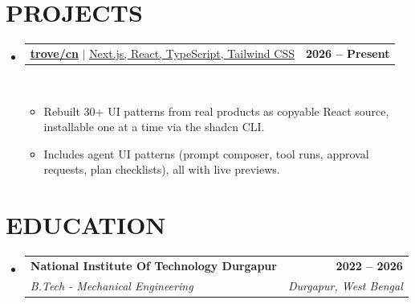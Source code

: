 \documentclass[letterpaper, 10pt]{article}
\makeatletter
\newcommand{\resumeItem}[1]{ \item\small{ {#1 \vspace{-3pt}} } }
\newcommand{\resumeSubheading}[4]{
\vspace{2pt}
\item
\begin{tabular*}{1.0\textwidth}[t]{l@{\extracolsep{\fill}}r}
  \textbf{#1} & \textbf{\small #2} \\
  \textit{\small#3} & \textit{\small #4} \\
\end{tabular*}
\vspace{-5pt}
}
\newcommand{\resumeProjectHeading}[2]{ \item
\begin{tabular*}{1.001\textwidth}{l@{\extracolsep{\fill}}r}
  \small#1 & \textbf{\small #2} \\
\end{tabular*}
\vspace{-7pt}
}
\newcommand{\resumeSubHeadingListStart}{\begin{itemize}[leftmargin=0.0in, label={}]}
\newcommand{\resumeSubHeadingListEnd}{\end{itemize}}
\newcommand{\resumeItemListStart}{\begin{itemize}
\vspace{-3pt}}
\newcommand{\resumeItemListEnd}{\end{itemize}
\vspace{-5pt}}
\makeatother
\begin{document}
  \section{PROJECTS}
  \vspace{-5pt}
  \resumeSubHeadingListStart \resumeProjectHeading
  {\href{https://trovecn.dev}{\textbf{\underline{trove/cn}}} $|$ \underline{Next.js, React, TypeScript, Tailwind CSS}}{2026 -- Present}\\
  \resumeItemListStart \resumeItem{\normalsize{Rebuilt 30+ UI patterns from real products as copyable React source, installable one at a time via the shadcn CLI.}}
  \resumeItem{\normalsize{Includes agent UI patterns (prompt composer, tool runs, approval requests, plan checklists), all with live previews.}}
  \resumeItemListEnd \resumeSubHeadingListEnd
  \vspace{-14pt}

  \section{EDUCATION}
  \resumeSubHeadingListStart \resumeSubheading
  {National Institute Of Technology Durgapur}{2022 -- 2026}
  {B.Tech - Mechanical Engineering}{Durgapur, West Bengal}
  \resumeSubHeadingListEnd
\end{document}
